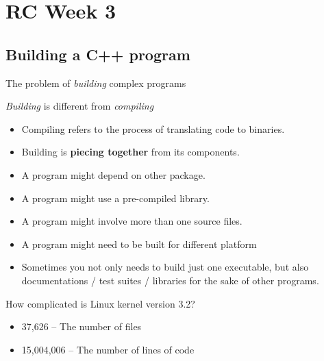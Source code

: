 \section{RC Week 3}
\subsection{Building a C++ program}
\begin{frame}{The problem of \textit{building} complex programs}
\vspace{-0.10in}
\begin{block}{\textit{Building} is different from \textit{compiling}}
	\vspace{-0.07in}
	\begin{itemize}
		\item Compiling refers to the process of translating code to binaries.
		\item Building is \textbf{piecing together} from its components.
		\item A program might depend on other package.
		\item A program might use a pre-compiled library.
		\item A program might involve more than one source files.
		\item A program might need to be built for different platform
		\item Sometimes you not only needs to build just one executable, but also documentations / test suites / libraries for the sake of other programs.
	\end{itemize}
\end{block}
\vspace{-0.15in}
\begin{block}{How complicated is Linux kernel version 3.2?}
	\vspace{-0.07in}
	\begin{itemize}
		\item 37,626 – The number of files 
		\item 15,004,006 – The number of lines of code 
	\end{itemize}
\end{block}
\end{frame}

